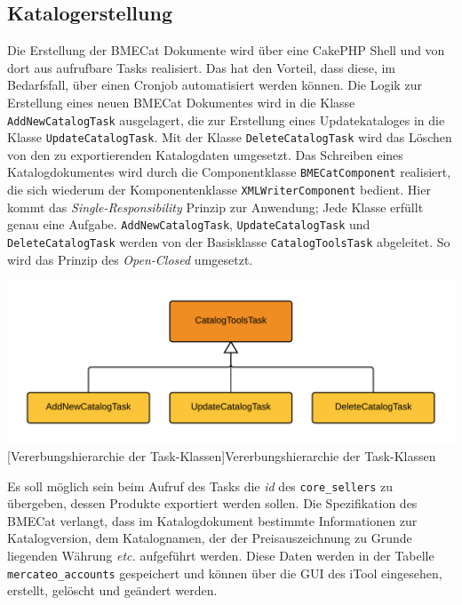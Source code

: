	\subsection{Katalogerstellung}
	
	Die Erstellung der BMECat Dokumente wird über eine CakePHP Shell und von dort aus aufrufbare Tasks realisiert. Das hat den Vorteil, dass diese, im Bedarfsfall, über einen Cronjob automatisiert werden können.
	Die Logik zur Erstellung eines neuen BMECat Dokumentes wird in die Klasse \texttt{AddNewCatalogTask} ausgelagert, die zur Erstellung eines Updatekataloges in die Klasse 
	\texttt{UpdateCatalogTask}. Mit der Klasse \texttt{DeleteCatalogTask} wird das Löschen von den zu exportierenden Katalogdaten umgesetzt. Das Schreiben eines Katalogdokumentes wird durch die Componentklasse \texttt{BMECatComponent} realisiert, die sich wiederum der Komponentenklasse \texttt{XMLWriterComponent} bedient. Hier kommt das \textit{Single-Responsibility} Prinzip zur Anwendung; Jede Klasse erfüllt genau eine Aufgabe. \texttt{AddNewCatalogTask}, \texttt{UpdateCatalogTask} und \texttt{DeleteCatalogTask} werden von der Basisklasse \texttt{CatalogToolsTask} abgeleitet. So wird das Prinzip des \textit{Open-Closed} umgesetzt.

	\begin{minipage}{\linewidth}
		\vspace{1em}
		\centering
		\includegraphics[width=0.7 \linewidth]{img/VererbungShellSimple}
		[Vererbungshierarchie der Task-Klassen]{Vererbungshierarchie der Task-Klassen}
		\vspace{1em}
	\end{minipage}	
	
	Es soll möglich sein beim Aufruf des Tasks die \textit{id} des \texttt{core\_sellers} zu übergeben, dessen Produkte exportiert werden sollen. Die Spezifikation des BMECat verlangt, dass im Katalogdokument bestimmte Informationen zur Katalogversion, dem Katalognamen, der der Preisauszeichnung zu Grunde liegenden Währung \textit{etc.} aufgeführt werden. Diese Daten werden in der Tabelle \texttt{mercateo\_accounts} gespeichert und können über die GUI des iTool eingesehen, erstellt, gelöscht und geändert werden.\\
	
